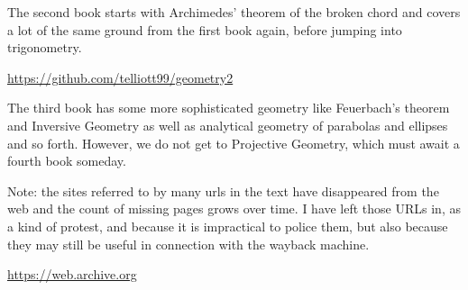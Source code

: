 \documentclass[11pt, oneside]{article}
\begin{document}
The second book starts with Archimedes' theorem of the broken chord and covers a lot of the same ground from the first book again, before jumping into trigonometry.

\url{https://github.com/telliott99/geometry2}

The third book has some more sophisticated geometry like Feuerbach's theorem and Inversive Geometry as well as analytical geometry of parabolas and ellipses and so forth.  However, we do not get to Projective Geometry, which must await a fourth book someday.

Note:  the sites referred to by many urls in the text have disappeared from the web and the count of missing pages grows over time.  I have left those URLs in, as a kind of protest, and because it is impractical to police them, but also because they may still be useful in connection with the wayback machine.

\url{https://web.archive.org} 
\end{document}
